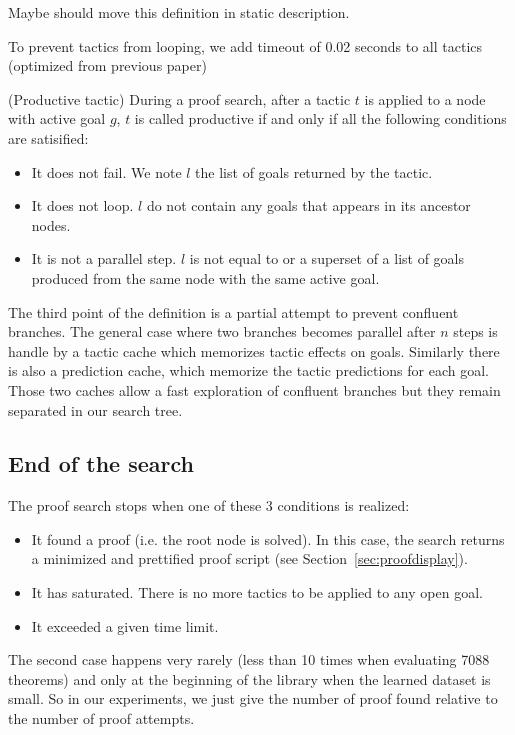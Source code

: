 \documentclass[runningheads,a4paper,draft]{svjour3}
\begin{document}
Maybe should move this definition in static description.

To prevent tactics from looping, we add timeout of 0.02 seconds to all tactics 
(optimized from previous paper)

\begin{definition} (Productive tactic)
During a proof search, after a tactic $t$ is applied to a node with active goal 
$g$, $t$ is called 
productive if and only if all the following conditions are satisified:
\begin{itemize}
\item It does not fail. We note $l$ the list of goals returned by the tactic.
\item It does not loop. $l$ do not contain any goals that appears in its 
ancestor nodes.
\item It is not a parallel step. $l$ is not equal to or a superset of a list of 
goals produced from the same node with the same active goal.
\end{itemize}

The third point of the definition is a partial attempt to prevent confluent 
branches. The general 
case where two branches becomes parallel after $n$ steps is handle by a
tactic cache which memorizes tactic effects on goals. Similarly there is also a 
prediction cache, which memorize the tactic predictions for each goal. Those 
two caches allow a fast exploration of confluent branches but they remain 
separated in our search tree.


\subsection{End of the search}
The proof search stops when one of these 3 conditions is realized:
\begin{itemize}
\item It found a proof (i.e. the root node is solved). In this case, 
the search returns a minimized and 
prettified proof script (see Section~\ref{sec:proofdisplay}).
\item It has saturated. 
There is no more tactics to be applied to any open goal. 
\item It exceeded a given time limit.
\end{itemize}

The second case happens very rarely (less than 10 times when evaluating 7088 
theorems) and only at the beginning of the library when the learned dataset is 
small. So in our experiments, we just give the number of proof found relative 
to the number of proof attempts.
\end{definition}
\end{document}
